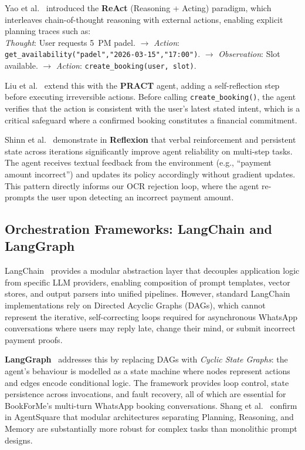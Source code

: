 Yao et al.~\cite{yao2023} introduced the \textbf{ReAct} (Reasoning + Acting)
paradigm, which interleaves chain-of-thought reasoning with external actions,
enabling explicit planning traces such as:\\
\textit{Thought}: User requests 5~PM padel.
$\rightarrow$ \textit{Action}: \texttt{get\_availability("padel","2026-03-15","17:00")}.
$\rightarrow$ \textit{Observation}: Slot available.
$\rightarrow$ \textit{Action}: \texttt{create\_booking(user, slot)}.

Liu et al.~\cite{liu2024} extend this with the \textbf{PRACT} agent, adding a
self-reflection step before executing irreversible actions. Before calling
\texttt{create\_booking()}, the agent verifies that the action is consistent
with the user's latest stated intent, which is a critical safeguard where a
confirmed booking constitutes a financial commitment.

Shinn et al.~\cite{shinn2023} demonstrate in \textbf{Reflexion} that verbal
reinforcement and persistent state across iterations significantly improve agent
reliability on multi-step tasks. The agent receives textual feedback from the
environment (e.g., ``payment amount incorrect'') and updates its policy
accordingly without gradient updates. This pattern directly informs our OCR
rejection loop, where the agent re-prompts the user upon detecting an incorrect
payment amount.

\subsection{Orchestration Frameworks: LangChain and LangGraph}

LangChain~\cite{mavroudis2024} provides a modular abstraction layer that
decouples application logic from specific LLM providers, enabling composition
of prompt templates, vector stores, and output parsers into unified pipelines.
However, standard LangChain implementations rely on Directed Acyclic Graphs
(DAGs), which cannot represent the iterative, self-correcting loops required
for asynchronous WhatsApp conversations where users may reply late, change
their mind, or submit incorrect payment proofs.

\textbf{LangGraph}~\cite{langgraph2024} addresses this by replacing DAGs with
\textit{Cyclic State Graphs}: the agent's behaviour is modelled as a state
machine where nodes represent actions and edges encode conditional logic. The
framework provides loop control, state persistence across invocations, and
fault recovery, all of which are essential for BookForMe's multi-turn WhatsApp
booking conversations. Shang et al.~\cite{shang2024} confirm in AgentSquare
that modular architectures separating Planning, Reasoning, and Memory are
substantially more robust for complex tasks than monolithic prompt designs.

